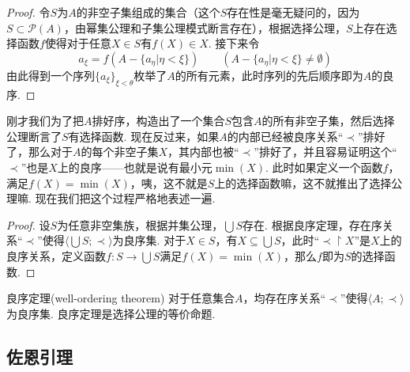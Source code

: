 \documentclass[main.tex]{subfiles}
\begin{document}
\begin{proof}
    令\(S\)为\(A\)的非空子集组成的集合（这个\(S\)存在性是毫无疑问的，因为\(S \subset \mathcal{P}(A)\)，由幂集公理和子集公理模式断言存在），根据选择公理，\(S\)上存在选择函数\(f\)使得对于任意\(X \in S\)有\(f(X) \in X\). 接下来令
    \[a_\xi = f(A-\{a_\eta | \eta < \xi\}) \qquad (A-\{a_\eta | \eta < \xi\} \neq \emptyset)\]
    由此得到一个序列\(\{a_\xi\}_{\xi < \theta}\)枚举了\(A\)的所有元素，此时序列的先后顺序即为\(A\)的良序.
\end{proof}

刚才我们为了把\(A\)排好序，构造出了一个集合\(S\)包含\(A\)的所有非空子集，然后选择公理断言了\(S\)有选择函数. 现在反过来，如果\(A\)的内部已经被良序关系“\(\prec\)”排好了，那么对于\(A\)的每个非空子集\(X\)，其内部也被“\(\prec\)”排好了，并且容易证明这个“\(\prec\)”也是\(X\)上的良序——也就是说有最小元\(\min(X)\). 此时如果定义一个函数\(f\)，满足\(f(X)=\min(X)\)，咦，这不就是\(S\)上的选择函数嘛，这不就推出了选择公理嘛. 现在我们把这个过程严格地表述一遍.

\begin{proof}
    设\(S\)为任意非空集族，根据并集公理，\(\bigcup S\)存在. 根据良序定理，存在序关系“\(\prec\)”使得\(\langle \bigcup S; \prec \rangle\)为良序集. 对于\(X \in S\)，有\(X \subseteq \bigcup S\)，此时“\(\prec \upharpoonright X\)”是\(X\)上的良序关系，定义函数\(f: S \to \bigcup S\)满足\(f(X) = \min(X)\)，那么\(f\)即为\(S\)的选择函数.
\end{proof}

\begin{theorem}{良序定理(well-ordering theorem)}
    对于任意集合\(A\)，均存在序关系“\(\prec\)”使得\(\langle A; \prec \rangle\)为良序集. \newline
    良序定理是选择公理的等价命题.
\end{theorem}

\subsection{佐恩引理}
\end{document}
